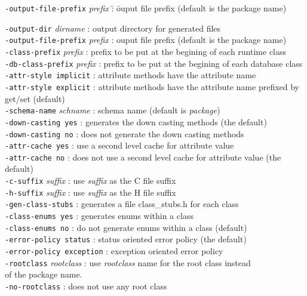 \begin{tabbing}
\texttt{-output-file-prefix} \emph{prefix} \= : \= ouput file prefix (default is the package name)\kill

\texttt{-output-dir} \emph{dirname}       \> : \> output directory for generated files\\
\texttt{-output-file-prefix} \emph{prefix}\> : \> ouput file prefix (default is the package name)\\
\texttt{-class-prefix} \emph{prefix}      \> : \> prefix to be put at the begining of each runtime class\\
\texttt{-db-class-prefix} \emph{prefix}   \> : \> prefix to be put at the begining of each database class\\
\texttt{-attr-style implicit}        \> : \> attribute methods have the attribute name\\
\texttt{-attr-style explicit}        \> : \> attribute methods have the attribute name prefixed by\\
                              \> \>get/set (default)\\
\texttt{-schema-name} \emph{schname}      \> : \> schema name (default is \emph{package})\\
\texttt{-down-casting yes}           \> : \> generates the down casting methods (the default)\\
\texttt{-down-casting no}            \> : \> does not generate the down casting methods\\
\texttt{-attr-cache yes}             \> : \> use a second level cache for attribute value\\
\texttt{-attr-cache no}              \> : \> does not use a second level cache for attribute value (the default)\\
\texttt{-c-suffix} \emph{suffix}          \> : \> use \emph{suffix} as the C file suffix\\
\texttt{-h-suffix} \emph{suffix}          \> : \> use \emph{suffix} as the H file suffix\\
\texttt{-gen-class-stubs}            \> : \> generates a file class\_stubs.h for each class\\
\texttt{-class-enums yes}            \> : \> generates enums within a class\\
\texttt{-class-enums no}             \> : \> do not generate enums within a class (default)\\
\texttt{-error-policy status}        \> : \> status oriented error policy (the default)\\
\texttt{-error-policy exception}     \> : \> exception oriented error policy\\
\texttt{-rootclass} \emph{rootclass}      \> : \> use \emph{rootclass} name for the root class instead\\
\>  \> of the package name.\\
\texttt{-no-rootclass}               \> : \> does not use any root class\\
\end{tabbing}
